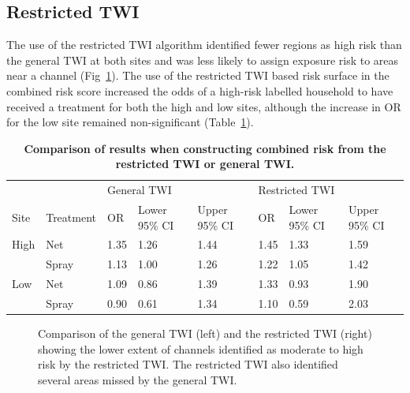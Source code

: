 \documentclass[10pt,letterpaper]{article}\usepackage[]{graphicx}\usepackage[]{color}
\begin{document}
{\subsection{Restricted TWI}

The use of the restricted TWI algorithm identified fewer regions as high risk than the general TWI at both sites and was less likely to assign exposure risk to areas near a channel (Fig~\ref{twis}).  The use of the restricted TWI based risk surface in the combined risk score increased the odds of a high-risk labelled household to have received a treatment for both the high and low sites,  although the increase in OR for the low site remained non-significant (Table~\ref{Sens}).

  


\begin{table}[!ht]
\begin{adjustwidth}{-2.25in}{0in} %
\centering
\caption{
{\bf Comparison of results when constructing combined risk from the restricted TWI or general TWI.} 
}
\begin{tabular}{llllllll}
  \hline
 &  & \multicolumn{3}{l}{General TWI} & \multicolumn{3}{l}{Restricted TWI}\\
Site & Treatment & OR & Lower 95\% CI & Upper 95\% CI & OR & Lower 95\% CI & Upper 95\% CI \\ 
  \hline
High & Net & 1.35 & 1.26 & 1.44 & 1.45 & 1.33 & 1.59 \\ 
   & Spray & 1.13 & 1.00 & 1.26 & 1.22 & 1.05 & 1.42 \\ 
  Low & Net & 1.09 & 0.86 & 1.39 & 1.33 & 0.93 & 1.90 \\ 
   & Spray & 0.90 & 0.61 & 1.34 & 1.10 & 0.59 & 2.03 \\ 
   \hline
\end{tabular}
\label{Sens}
\end{adjustwidth}
\end{table}

\begin{figure}[!h]
\centering
\caption{Comparison of the general TWI (left) and the restricted TWI (right) showing the lower extent of channels identified as moderate to high risk by the restricted TWI.  The restricted TWI also identified several areas missed by the general TWI. }
\label{twis}
\end{figure}





}
\end{document}
